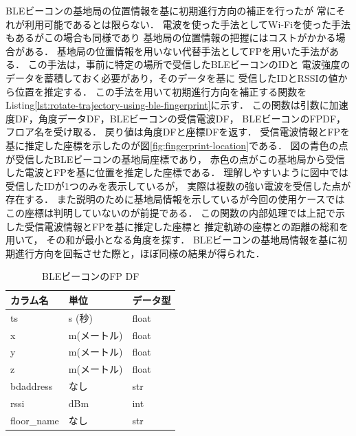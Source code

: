 BLEビーコンの基地局の位置情報を基に初期進行方向の補正を行ったが
常にそれが利用可能であるとは限らない．
電波を使った手法としてWi-Fiを使った手法もあるがこの場合も同様であり
基地局の位置情報の把握にはコストがかかる場合がある．
基地局の位置情報を用いない代替手法としてFPを用いた手法がある．
この手法は，事前に特定の場所で受信したBLEビーコンのIDと
電波強度のデータを蓄積しておく必要があり，そのデータを基に
受信したIDとRSSIの値から位置を推定する．
この手法を用いて初期進行方向を補正する関数を
Listing\ref{lst:rotate-trajectory-using-ble-fingerprint}に示す．
この関数は引数に加速度DF，角度データDF，BLEビーコンの受信電波DF，
BLEビーコンのFPDF，フロア名を受け取る．
戻り値は角度DFと座標DFを返す．
受信電波情報とFPを基に推定した座標を示したのが図\ref{fig:fingerprint-location}である．
図の青色の点が受信したBLEビーコンの基地局座標であり，
赤色の点がこの基地局から受信した電波とFPを基に位置を推定した座標である．
理解しやすいように図中では受信したIDが1つのみを表示しているが，
実際は複数の強い電波を受信した点が存在する．
また説明のために基地局情報を示しているが今回の使用ケースでは
この座標は判明していないのが前提である．
この関数の内部処理では上記で示した受信電波情報とFPを基に推定した座標と
推定軌跡の座標との距離の総和を用いて，
その和が最小となる角度を探す．
BLEビーコンの基地局情報を基に初期進行方向を回転させた際と，ほぼ同様の結果が得られた．


\begin{table}[ht]
  \caption{BLEビーコンのFP DF}
	\centering
	\begin{tabular}{lll}
		\toprule
		カラム名        & 単位      & データ型  \\
		\midrule
		ts          & s (秒)   & float \\
		x           & m(メートル) & float \\
		y           & m(メートル) & float \\
		z           & m(メートル) & float \\
		bdaddress   & なし      & str   \\
		rssi        & dBm     & int   \\
		floor\_name & なし      & str   \\
		\bottomrule
	\end{tabular}
	\label{table:ble-beacon-fingerprint-df}
\end{table}


